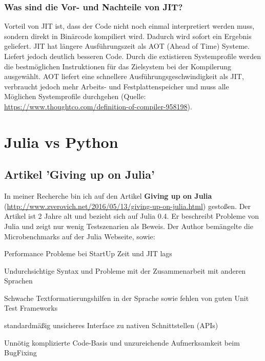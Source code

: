 \documentclass[11pt]{article}
\begin{document}
\subsubsection{Was sind die Vor- und Nachteile von JIT?}
Vorteil von JIT ist, dass der Code nicht noch einmal interpretiert werden muss, sondern direkt in Binärcode kompiliert wird. Dadurch wird sofort ein Ergebnis geliefert. JIT hat längere Ausführungszeit als AOT (Ahead of Time) Systeme. Liefert jedoch deutlich besseren Code. Durch die extistieren Systemprofile werden die bestmöglichen Instruktionen für das Zielsystem bei der Kompilerung ausgewählt. AOT liefert eine schnellere Ausführungsgeschwindigkeit als JIT, verbraucht jedoch mehr Arbeits- und Festplattenspeicher und muss alle Möglichen Systemprofile durchgehen (Quelle: \url{https://www.thoughtco.com/definition-of-compiler-958198}).

\section{Julia vs Python}

\subsection{Artikel 'Giving up on Julia'}

In meiner Recherche bin ich auf den Artikel \textbf{Giving up on Julia} (\url{http://www.zverovich.net/2016/05/13/giving-up-on-julia.html}) gestoßen. Der Artikel ist 2 Jahre alt und bezieht sich auf Julia 0.4. Er beschreibt Probleme von Julia und zeigt nur wenig Testszenarien als Beweis. Der Author bemängelte die Microbenchmarks auf der Julia Webseite, sowie:

\begin{flushleft}
\begin{compactitem}
\item Performance Probleme bei StartUp Zeit und JIT lags
\item Undurchsichtige Syntax und Probleme mit der Zusammenarbeit mit anderen Sprachen
\item Schwache Textformatierungshilfen in der Sprache sowie fehlen von guten Unit Test Frameworks
\item standardmäßig unsicheres Interface zu nativen Schnittstellen (APIs)
\item Unnötig komplizierte Code-Basis und unzureichende Aufmerksamkeit beim BugFixing
\end{compactitem}
\end{flushleft}
\end{document}
